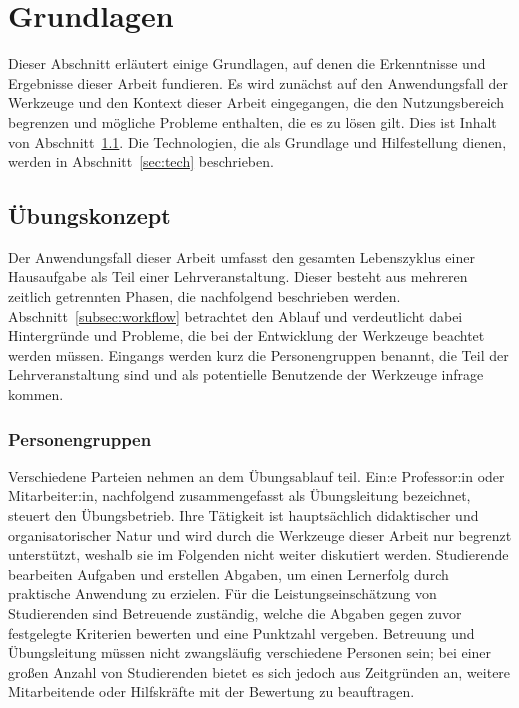 \chapter{Grundlagen}\label{ch:basics}

Dieser Abschnitt erläutert einige Grundlagen, auf denen die Erkenntnisse und Ergebnisse dieser Arbeit fundieren.
Es wird zunächst auf den Anwendungsfall der Werkzeuge und den Kontext dieser Arbeit eingegangen, die den Nutzungsbereich begrenzen und mögliche Probleme enthalten, die es zu lösen gilt.
Dies ist Inhalt von Abschnitt~\ref{sec:programming-assignments}.
Die Technologien, die als Grundlage und Hilfestellung dienen, werden in Abschnitt~\ref{sec:tech} beschrieben.

\section{Übungskonzept}\label{sec:programming-assignments}

Der Anwendungsfall dieser Arbeit umfasst den gesamten Lebenszyklus einer Hausaufgabe als Teil einer Lehrveranstaltung.
Dieser besteht aus mehreren zeitlich getrennten Phasen, die nachfolgend beschrieben werden.
Abschnitt~\ref{subsec:workflow} betrachtet den Ablauf und verdeutlicht dabei Hintergründe und Probleme, die bei der Entwicklung der Werkzeuge beachtet werden müssen.
Eingangs werden kurz die Personengruppen benannt, die Teil der Lehrveranstaltung sind und als potentielle Benutzende der Werkzeuge infrage kommen.

\subsection{Personengruppen}\label{subsec:people}

Verschiedene Parteien nehmen an dem Übungsablauf teil.
Ein:e Professor:in oder Mitarbeiter:in, nachfolgend zusammengefasst als Übungsleitung bezeichnet, steuert den Übungsbetrieb.
Ihre Tätigkeit ist hauptsächlich didaktischer und organisatorischer Natur und wird durch die Werkzeuge dieser Arbeit nur begrenzt unterstützt, weshalb sie im Folgenden nicht weiter diskutiert werden.
Studierende bearbeiten Aufgaben und erstellen Abgaben, um einen Lernerfolg durch praktische Anwendung zu erzielen.
Für die Leistungseinschätzung von Studierenden sind Betreuende zuständig, welche die Abgaben gegen zuvor festgelegte Kriterien bewerten und eine Punktzahl vergeben.
Betreuung und Übungsleitung müssen nicht zwangsläufig verschiedene Personen sein;
bei einer großen Anzahl von Studierenden bietet es sich jedoch aus Zeitgründen an, weitere Mitarbeitende oder Hilfskräfte mit der Bewertung zu beauftragen.

